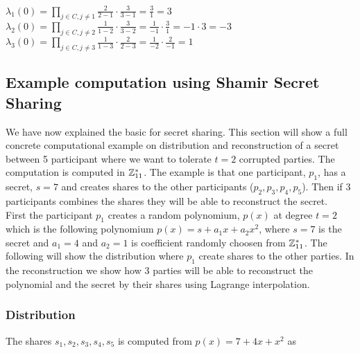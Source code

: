 \noindent
\begin{infobox}
\begin{math}\lambda_1(0)=\prod\limits_{j\in C,j\neq 1} \frac{2}{2-1}  \cdot  \frac{3}{3-1} =\frac{3}{1} = 3 \end{math}\\
\begin{math}\lambda_2(0)=\prod\limits_{j\in C,j\neq 2} \frac{1}{1-2}  \cdot  \frac{3}{3-2} =\frac{1}{-1} \cdot  \frac{3}{1} =-1 \cdot  3=-3 \end{math}\\
\begin{math}\lambda_3(0)=\prod\limits_{j\in C,j\neq 3} \frac{1}{1-3}  \cdot  \frac{2}{2-3} =\frac{1}{-2} \cdot  \frac{2}{-1} =1 \end{math}\\
\label{info:Computing_the_coefficients}
\end{infobox}

\subsection{Example computation using Shamir Secret Sharing}
We have now explained the basic for secret sharing. This section will show a full concrete computational example on distribution and reconstruction of a secret between 5 participant where we want to tolerate $t=2$ corrupted parties. The computation is computed in $\mathbb{Z}_{11}^*$. The example is that one participant, $p_1$, has a secret, $s=7$ and creates shares to the other participants ($p_2, p_3, p_4, p_5$). Then if $3$ participants combines the shares they will be able to reconstruct the secret. \\

\noindent
First the participant $p_1$ creates a random polynomium, $p(x)$ at degree $t=2$ which is the following polynomium $p(x)=s + a_{1}x+ a_{2}x^2$, where $s=7$ is the secret and $a_{1}=4$ and $a_{2}=1$ is coefficient randomly choosen from $\mathbb{Z}_{11}^*$. The following will show the distribution where $p_1$ create shares to the other parties. In the reconstruction we show how $3$ parties will be able to reconstruct the polynomial and the secret by their shares using Lagrange interpolation.   

\subsubsection{Distribution}
The shares $s_1, s_2, s_3, s_4,s_5$ is computed from $p(x)=7 + 4x+ x^2$ as

